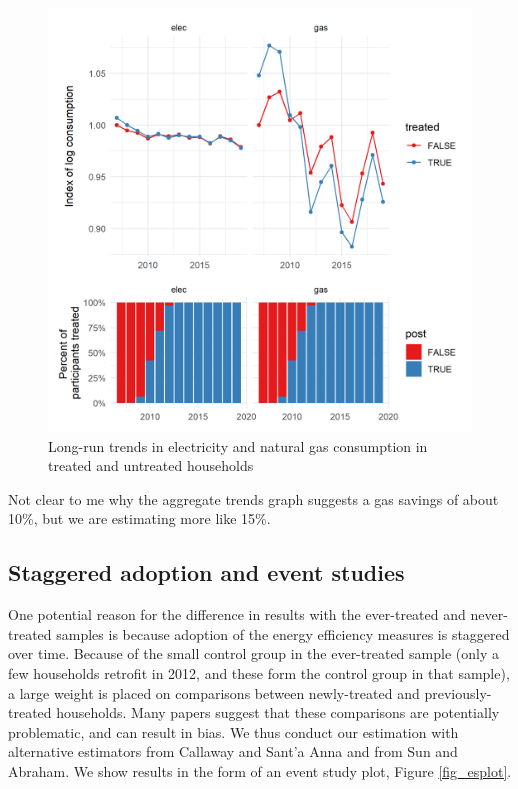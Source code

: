 \documentclass{article}
\begin{document}
\begin{figure}
	\includegraphics{../output_figures_tables/aggregate_trend_graph}
	\caption{Long-run trends in electricity and natural gas consumption in treated and untreated households}\label{fig_agg}
\end{figure}

{\color{red} Not clear to me why the aggregate trends graph suggests a gas savings of about 10\%, but we are estimating more like 15\%.}


\subsection{Staggered adoption and event studies}
One potential reason for the difference in results with the ever-treated and never-treated samples is because adoption of the energy efficiency measures is staggered over time. Because of the small control group in the ever-treated sample (only a few households retrofit in 2012, and these form the control group in that sample), a large weight is placed on comparisons between newly-treated and previously-treated households. Many papers suggest that these comparisons are potentially problematic, and can result in bias.  We thus conduct our estimation with alternative estimators from Callaway and Sant'a Anna and from Sun and Abraham.  We show results in the form of an event study plot, Figure \ref{fig_esplot}.
\end{document}
